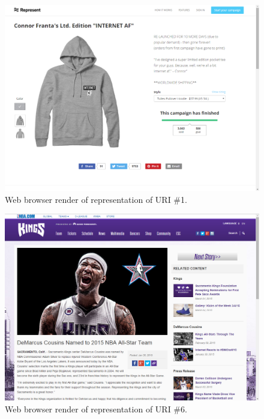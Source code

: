 \documentclass[a4paper,12pt]{article}
\begin{document}
\begin{appendices}
\begin{figure}[H]
    \centering
    \includegraphics[scale=0.5]{images/1_original.png}
    \caption{Web browser render of representation of URI \#1.}
\end{figure}
\begin{figure}[H]
    \centering
    \includegraphics[scale=0.5]{images/6_original.png}
    \caption{Web browser render of representation of URI \#6.}
\end{figure}
\begin{figure}[H]
    \centering

\end{figure}
\end{appendices}
\end{document}
